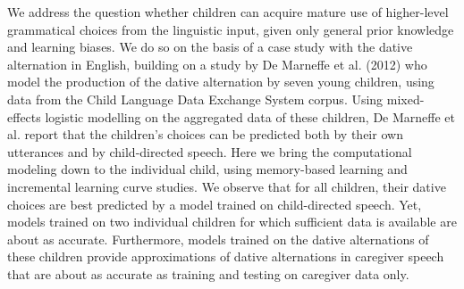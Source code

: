 We address the question whether children can acquire mature use of higher-level grammatical choices from the linguistic input, given only general prior knowledge and learning biases. We do so on the basis of a case study with the dative alternation in English, building on a study by De Marneffe et al. (2012) who model the production of the dative alternation by seven young children, using data from the Child Language Data Exchange System corpus. Using mixed-effects logistic modelling on the aggregated data of these  children, De Marneffe et al. report that the children's choices can be predicted both by their own utterances and by child-directed speech. Here we bring the computational modeling down to the individual child, using memory-based learning and incremental learning curve studies. We observe that for all children, their dative choices are best predicted by a model trained on child-directed speech. Yet, models trained on two individual children for which sufficient data is available are about as accurate. Furthermore, models trained on the dative alternations of these children provide approximations of dative alternations in caregiver speech that are about as accurate as training and testing on caregiver data only.
